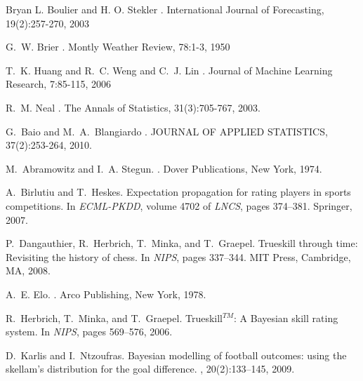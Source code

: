 \begin{thebibliography}{}

Bryan L. Boulier and H. O. Stekler
.
\newblock International Journal of Forecasting, 19(2):257-270, 2003


G.~W. Brier
.
\newblock Montly Weather Review, 78:1-3, 1950


T.~K. Huang and R.~C. Weng and C.~J. Lin
.
\newblock Journal of Machine Learning Research, 7:85-115, 2006

R.~M. Neal
.
\newblock The Annals of Statistics, 31(3):705-767, 2003.

G.~Baio and M.~A.~Blangiardo
.
\newblock JOURNAL OF APPLIED STATISTICS, 37(2):253-264, 2010.

M.~Abramowitz and I.~A. Stegun.
.
\newblock Dover Publications, New York, 1974.

A.~Birlutiu and T.~Heskes.
\newblock Expectation propagation for rating players in sports competitions.
\newblock In {\em ECML-PKDD}, volume 4702 of {\em LNCS}, pages
  374--381. Springer, 2007.

P.~Dangauthier, R.~Herbrich, T.~Minka, and T.~Graepel.
\newblock Trueskill through time: Revisiting the history of chess.
\newblock In {\em NIPS}, pages 337--344. MIT
  Press, Cambridge, MA, 2008.

A.~E. Elo.
.
\newblock Arco Publishing, New York, 1978.

R.~Herbrich, T.~Minka, and T.~Graepel.
\newblock Trueskill$^{TM}$: A {B}ayesian skill rating system.
\newblock In {\em NIPS}, pages 569--576, 2006.

D.~Karlis and I.~Ntzoufras.
\newblock Bayesian modelling of football outcomes: using the skellam's
  distribution for the goal difference.
, 20(2):133--145, 2009.


\end{thebibliography}
